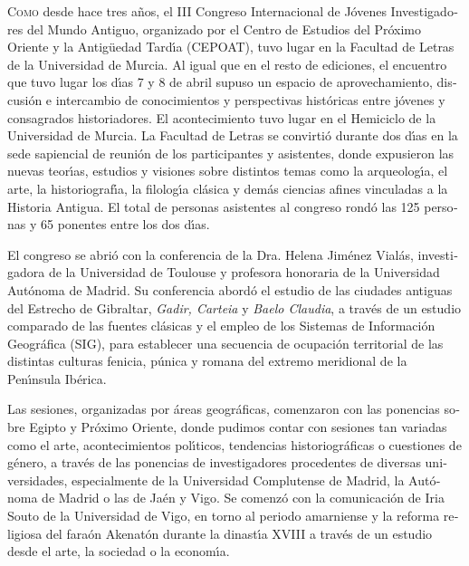 %
\begin{otherlanguage}{spanish}
\IJSRAopening
\lettrine{C}{omo} desde hace tres a\~{n}os, el III Congreso Internacional de J\'{o}venes Investigadores del Mundo Antiguo, organizado por el Centro de Estudios del Pr\'{o}ximo Oriente y la Antig\"{u}edad Tard\'{\i}a (CEPOAT), tuvo lugar en la Facultad de Letras de la Universidad de Murcia. Al igual que en el resto de ediciones, el encuentro que tuvo lugar los d\'{\i}as 7 y 8 de abril supuso un espacio de aprovechamiento, discusi\'{o}n e intercambio de conocimientos y perspectivas hist\'{o}ricas entre j\'{o}venes y consagrados historiadores. El acontecimiento tuvo lugar en el Hemiciclo de la Universidad de Murcia. La Facultad de Letras se convirti\'{o} durante dos d\'{\i}as en la sede sapiencial de reuni\'{o}n de los participantes y asistentes, donde expusieron las nuevas teor\'{\i}as, estudios y visiones sobre distintos temas como la arqueolog\'{\i}a, el arte, la historiograf\'{\i}a, la filolog\'{\i}a cl\'{a}sica y dem\'{a}s ciencias afines vinculadas a la Historia Antigua. El total de personas asistentes al congreso rond\'{o} las 125 personas y 65 ponentes entre los dos d\'{\i}as.

El congreso se abri\'{o} con la conferencia de la Dra. Helena Jim\'{e}nez Vial\'{a}s, investigadora de la Universidad de Toulouse y profesora honoraria de la Universidad Aut\'{o}noma de Madrid. Su conferencia abord\'{o} el estudio de las ciudades antiguas del Estrecho de Gibraltar, \textit{Gadir, Carteia} y \textit{Baelo Claudia}, a trav\'{e}s de un estudio comparado de las fuentes cl\'{a}sicas y el empleo de los Sistemas de Informaci\'{o}n Geogr\'{a}fica (SIG), para establecer una secuencia de ocupaci\'{o}n territorial de las distintas culturas fenicia, p\'{u}nica y romana del extremo meridional de la Pen\'{\i}nsula Ib\'{e}rica. 

Las sesiones, organizadas por \'{a}reas geogr\'{a}ficas, comenzaron con las ponencias sobre Egipto y Pr\'{o}ximo Oriente, donde pudimos contar con sesiones tan variadas como el arte, acontecimientos pol\'{\i}ticos, tendencias historiogr\'{a}ficas o cuestiones de g\'{e}nero, a trav\'{e}s de las ponencias de investigadores procedentes de diversas universidades, especialmente de la Universidad Complutense de Madrid, la Aut\'{o}noma de Madrid o las de Ja\'{e}n y Vigo. Se comenz\'{o} con la comunicaci\'{o}n de Iria Souto de la Universidad de Vigo, en torno al periodo amarniense y la reforma religiosa del fara\'{o}n Akenat\'{o}n durante la dinast\'{\i}a XVIII a trav\'{e}s de un estudio desde el arte, la sociedad o la econom\'{\i}a.


\end{otherlanguage}
